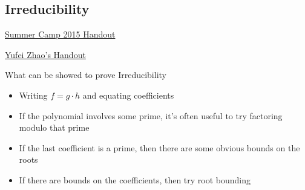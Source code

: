 \newpage\subsection{Irreducibility}

	\begin{myitemize}
		\item \href{https://euclid.ucc.ie/mathenr/IMOTraining/Polynomials2015.pdf}{Summer Camp 2015 Handout}
		\item \href{http://yufeizhao.com/olympiad/intpoly.pdf}{Yufei Zhao's Handout}
	\end{myitemize}

	
	\begin{take_note*}{What can be showed to prove Irreducibility}
		\begin{itemize}[wide=5pt]
			\item Writing $ f = g\cdot h $ and equating coefficients
			\item If the polynomial involves some prime, it's often useful to try factoring modulo that prime
			\item If the last coefficient is a prime, then there are some obvious bounds on the roots
			\item If there are bounds on the coefficients, then try root bounding
		\end{itemize}
	\end{take_note*}
	
	\bigskip 
	
	\begin{minipage}[t]{.48\linewidth}
	\end{minipage}\hfill%
	\begin{minipage}[t]{.48\linewidth}
	\end{minipage}
	
	\bigskip
		
